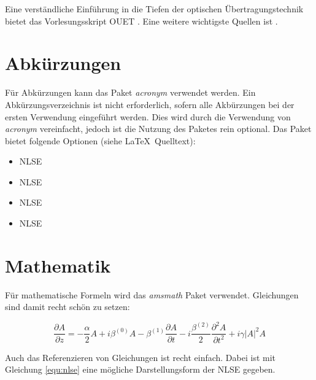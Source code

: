 
Eine verständliche Einführung in die Tiefen der optischen Übertragungstechnik bietet das Vorlesungsskript OUET \cite{ouet}.
Eine weitere wichtigste Quellen ist \cite{Agrawal2012}.



\section{Abkürzungen}
Für Abkürzungen kann das Paket \textit{acronym} verwendet werden.
Ein Abkürzungsverzeichnis ist nicht erforderlich, sofern alle Akbürzungen bei der ersten Verwendung eingeführt werden.
Dies wird durch die Verwendung von \textit{acronym} vereinfacht, jedoch ist die Nutzung des Paketes rein optional.
Das Paket bietet folgende Optionen (siehe  \LaTeX~Quelltext):\par\medskip
\begin{itemize}
 \item \ac{NLSE}         %
 \item \acs{NLSE}        %
 \item \acf{NLSE}        %
 \item \acl{NLSE}        %
\end{itemize}



\section{Mathematik}
Für mathematische Formeln wird das \textit{amsmath} Paket verwendet. Gleichungen sind damit recht schön zu setzen:

\begin{equation}
\frac{{\partial A}}{{\partial z}} =  - \frac{\alpha }{2}A + i{\beta ^{(0)}}A - {\beta ^{(1)}}\frac{{\partial A}}{{\partial t}} - i\frac{{{\beta ^{(2)}}}}{2}\frac{{{\partial ^2}A}}{{\partial {t^2}}} + i\gamma {\left| A \right|^2}A
\label{equ:nlse}
\end{equation}

Auch das Referenzieren von Gleichungen ist recht einfach. Dabei ist mit Gleichung \eqref{equ:nlse} eine mögliche Darstellungsform der \acs{NLSE} gegeben.

\fi
